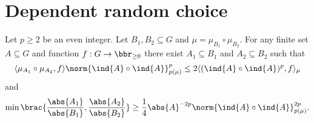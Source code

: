 \chapter{Dependent random choice}


\begin{lemma}
\label{drc}
\leanok
Let $p\geq 2$ be an even integer. Let $B_1,B_2\subseteq G$ and $\mu=\mu_{B_1}\circ\mu_{B_2}$. For any finite set $A\subseteq G$ and function $f:G\to\bbr_{\geq 0}$ there exist $A_1\subseteq B_1$ and $A_2\subseteq B_2$ such that
\[\langle \mu_{A_1}\circ \mu_{A_2}, f\rangle \norm{\ind{A}\circ \ind{A}}_{p(\mu)}^p\leq 2\langle (\ind{A}\circ \ind{A})^p,f\rangle_\mu\]
and
\[\min\brac{\frac{\abs{A_1}}{\abs{B_1}},\frac{\abs{A_2}}{\abs{B_2}}}\geq \frac{1}{4}\abs{A}^{-2p}\norm{\ind{A}\circ \ind{A}}_{p(\mu)}^{2p}.\]
\end{lemma}

